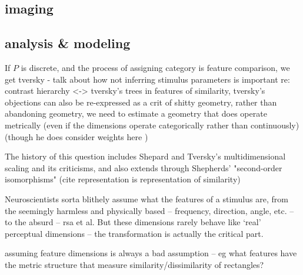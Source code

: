 \begin{multicols}{2}
\subsection{imaging}

\subsection{analysis \& modeling}



If $P$ is discrete, and the process of assigning category is feature comparison, we get tversky - talk about how not inferring stimulus parameters is important re: \cite{krantzSimilarityRectanglesAnalysis1975a,tverskyStudiesSimilarity1978,Tversky1970} contrast hierarchy <-> tversky's trees in features of similarity, tversky's objections can also be re-expressed as a crit of shitty geometry, rather than abandoning geometry, we need to estimate a geometry that does operate metrically (even if the dimensions operate categorically rather than continuously) (though he does consider weights here \cite{ritovDifferentialWeightingCommon1990})

The history of this question includes Shepard and Tversky's multidimensional scaling and its criticisms, and also extends through Shepherds' "second-order isomorphisms" (cite representation is representation of similarity)


Neuroscientists sorta blithely assume what the features of a stimulus are, from the seemingly harmless and physically based -- frequency, direction, angle, etc. -- to the absurd -- rsa et al. But these dimensions rarely behave like `real' perceptual dimensions \cite{krantzSimilarityRectanglesAnalysis1975a} -- the transformation is actually the critical part. 

assuming feature dimensions is always a bad assumption -- eg what features have the metric structure that measure similarity/dissimilarity of rectangles? \cite{krantzSimilarityRectanglesAnalysis1975a}

\end{multicols}
% 